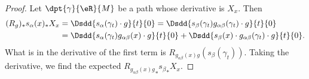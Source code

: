 \begin{proof}
	Let $\dpt{\gamma}{\eR}{M}$ be a path whose derivative is $X_x$. Then
	\begin{equation}
		\begin{split}
			(R_g)_*s_{\alpha}(x)_*X_x&=\Dsdd{s_{\alpha}(\gamma_t)\cdot g}{t}{0}
			=\Dsdd{  s_{\beta}(\gamma_t)g_{\alpha\beta}(\gamma_t)\cdot g  }{t}{0}\\
			&=\Dsdd{ s_{\alpha}(\gamma_t)g_{\alpha\beta}(x)\cdot g }{t}{0}
			+\Dsdd{ s_{\beta}(x)\cdot g_{\alpha\beta}(\gamma_t)\cdot g }{t}{0}.
		\end{split}
	\end{equation}
	What is in the derivative of the first term is $R_{g_{\alpha\beta}(x)g}(s_{\beta}(\gamma_t))$. Taking the derivative, we find the expected ${R_{g_{\alpha\beta}(x)g}}_*{s_{\beta}}_*X_x$.


\end{proof}
